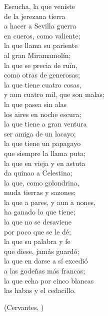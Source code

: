 \begin{exe}
	\ex\label{ex:perque}\begin{multicols}{2}Escucha, la que veniste\\
	de la jerezana tierra\vspace{.333\baselineskip}\\	
	a hacer a Sevilla guerra\\
	en cueros, como valiente;\vspace{.333\baselineskip}\\	
	la que llama su pariente\\
	al gran Miramamolín;\vspace{.333\baselineskip}\\		
	la que se precia de ruïn,\\
	como otras de generosas;\vspace{.333\baselineskip}\\	
	la que tiene cuatro cosas,\\
	y aun cuatro mil, que son malas;\vspace{.333\baselineskip}\\	
	la que pasea sin alas\\
	los aires en noche escura;\vspace{.333\baselineskip}\\	
	la que tiene a gran ventura\\
	ser amiga de un lacayo;\vspace{.333\baselineskip}\\
	la que tiene un papagayo\\
	que siempre la llama puta;\vspace{.333\baselineskip}\\
	la que en vieja y en astuta\\
	da quinao a Celestina;\vspace{.333\baselineskip}\\
	la que, como golondrina,\\
	muda tierras y sazones;\vspace{.333\baselineskip}\\
	la que a pares, y aun a nones,\\
	ha ganado lo que tiene;\vspace{.333\baselineskip}\\
	la que no se desaviene\\
	por poco que se le dé;\vspace{.333\baselineskip}\\
	la que su palabra y fe\\
	que diese, jamás guardó;\vspace{.333\baselineskip}\\
	la que en darse a sí excedió\\
	a las godeñas más francas;\vspace{.333\baselineskip}\\
	la que echa por cinco blancas\\
	las habas y el cedacillo.\end{multicols}\strut\hfill(Cervantes, )
\end{exe}

